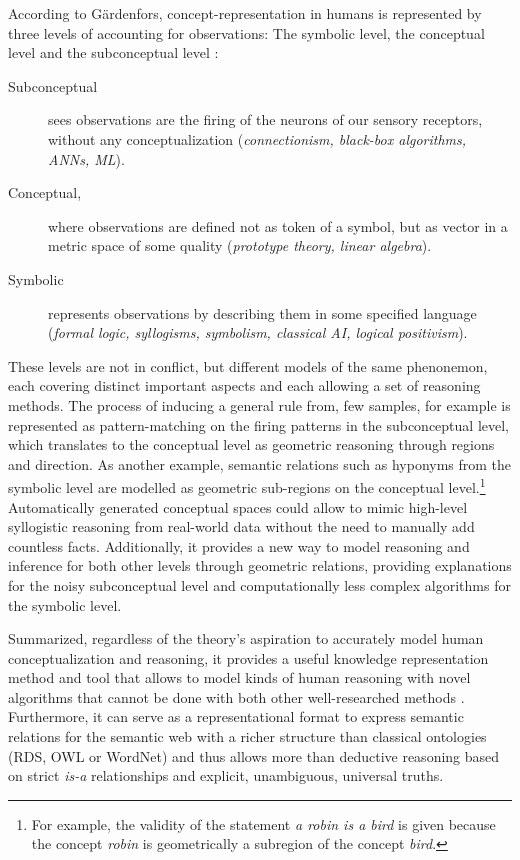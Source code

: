 
According to Gärdenfors, concept-representation in humans is represented by three levels of accounting for observations: The symbolic level, the conceptual level and the subconceptual level \cite[204]{Gardenfors2000a}:
\begin{description}
    \item[Subconceptual] sees observations are the firing of the neurons of our sensory receptors, without any conceptualization (\textit{connectionism, black-box algorithms, ANNs, ML}).
    \item[Conceptual,] where observations are defined not as token of a symbol, but as vector in a metric space of some quality (\textit{prototype theory, linear algebra}).
    \item[Symbolic] represents observations by describing them in some specified language (\textit{formal logic, syllogisms, symbolism, classical AI, logical positivism}).
\end{description}

These levels are not in conflict, but different models of the same phenonemon, each covering distinct important aspects and each allowing a set of reasoning methods. The process of inducing a general rule from, few samples, for example is represented as pattern-matching on the firing patterns in the subconceptual level, which translates to the conceptual level as geometric reasoning through regions and direction. As another example, semantic relations such as hyponyms from the symbolic level are modelled as geometric sub-regions on the conceptual level.\footnote{For example, the validity of the statement \textit{a robin is a bird} is given because the concept \textit{robin} is geometrically a subregion of the concept \textit{bird}.} Automatically generated conceptual spaces could allow to mimic high-level syllogistic reasoning from real-world data without the need to manually add countless facts. Additionally, it provides a new way to model reasoning and inference for both other levels through geometric relations, providing explanations for the noisy subconceptual level and computationally less complex algorithms for the symbolic level. 

Summarized, regardless of the theory's aspiration to accurately model human conceptualization and reasoning, it provides a useful knowledge representation method and tool that allows to model kinds of human reasoning with novel algorithms that cannot be done with both other well-researched methods \cite[Sec.~6.7]{Gardenfors2000a}. Furthermore, it can serve as a representational format to express semantic relations for the semantic web \cite{Gardenfors2004} with a richer structure than classical ontologies (\eg RDS, OWL or WordNet) and thus allows more than deductive reasoning based on strict \textit{is-a} relationships and explicit, unambiguous, universal truths.

